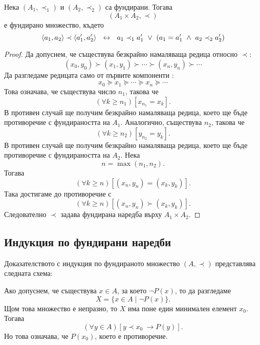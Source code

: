 \begin{prop}
  Нека $(A_1,\prec_1)$ и $(A_2,\prec_2)$ са фундирани.
  Тогава \[(A_1\times A_2, \prec)\]
  е фундирано множество, където
  \[\pair{a_1,a_2}\prec \pair{a^\prime_1,a^\prime_2}\ \iff\ a_1\prec_1 a^\prime_1\ \vee\ (a_1 = a^\prime_1\ \wedge\ a_2\prec_2 a^\prime_2)\]
\end{prop}
\begin{proof}
  Да допуснем, че съществува
  безкрайно намаляваща редица относно $\prec$:
  \[(x_0,y_0)\succ(x_1,y_1) \succ \cdots \succ (x_n,y_n)\succ\cdots\]
  Да разгледаме редицата само от първите компоненти :
  \[x_0 \succeq x_1 \succeq \cdots \succeq x_n \succeq \cdots\]
  Това означава, че съществува число $n_1$, такова че 
  \[(\forall k \geq n_1)[x_{n_1} = x_k].\]
  В противен случай ще получим безкрайно намаляваща редица, което ще бъде
  противоречие с фундираността на $A_1$.
  Аналогично, съществува $n_2$, такова че
  \[(\forall k \geq n_2)[y_{n_2} = y_k].\]
  В противен случай ще получим безкрайно намаляваща редица, което ще бъде
  противоречие с фундираността на $A_2$.
  Нека \[n = \max(n_1,n_2).\]
  Тогава 
  \[(\forall k\geq n)[(x_n,y_n) = (x_k,y_k)].\]
  Така достигаме до противоречие с 
  \[(\forall k \geq n)[(x_n,y_n) \succ (x_k,y_k)].\]
  Следователно $\prec$ задава фундирана наредба върху $A_1\times A_2$.
\end{proof}



\subsection*{Индукция по фундирани наредби}

Доказателството с индукция по фундираното множество $(A,\prec)$ представлява следната схема:
\begin{prooftree}
\end{prooftree}
Ако допуснем, че съществува $x \in A$, за което $\neg P(x)$, то да разгледаме
\[X = \{x\in A\mid \neg P(x)\}.\]
Щом това множество е непразно, то $X$ има поне един минимален елемент $x_0$.
Тогава
\[(\forall y\in A)[y \prec x_0\ \rightarrow P(y)].\]
Но това означава, че $P(x_0)$, което е противоречие.

